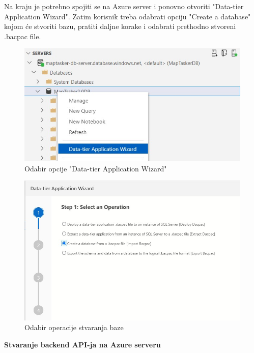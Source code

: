 		\noindent Na kraju je potrebno spojiti se na Azure server i ponovno otvoriti "Data-tier Application Wizard". Zatim korisnik treba odabrati opciju "Create a database" kojom će stvoriti bazu, pratiti daljne korake i odabrati prethodno stvoreni .bacpac file.

		\vspace{10mm}

		\begin{figure}[H]
			 \includegraphics[width=\linewidth]{./slike/baza5.jpg}
			  \centering
			  \caption{Odabir opcije "Data-tier Application Wizard"}
		  \end{figure}

		\vspace{10mm}

		\begin{figure}[H]
			 \includegraphics[width=\linewidth]{./slike/baza6.jpg}
			  \centering
			  \caption{Odabir operacije stvaranja baze}
		  \end{figure}

		\noindent\textbf{Stvaranje backend API-ja na Azure serveru}

